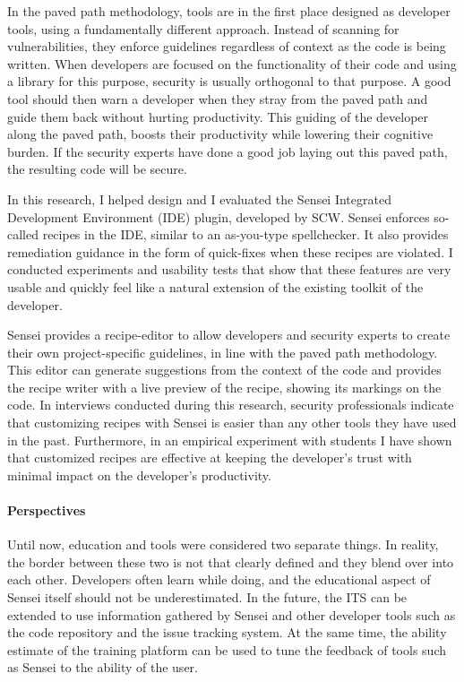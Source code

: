 In the paved path methodology, tools are in the first place designed as developer tools, using a fundamentally different approach.
Instead of scanning for vulnerabilities, they enforce guidelines regardless of context as the code is being written.
When developers are focused on the functionality of their code and using a library for this purpose, security is usually orthogonal to that purpose.
A good tool should then warn a developer when they stray from the paved path and guide them back without hurting productivity.
This guiding of the developer along the paved path, boosts their productivity while lowering their cognitive burden.
If the security experts have done a good job laying out this paved path, the resulting code will be secure.

In this research, I helped design and I evaluated the Sensei Integrated Development Environment (IDE) plugin, developed by SCW.
Sensei enforces so-called recipes in the IDE, similar to an as-you-type spellchecker.
It also provides remediation guidance in the form of quick-fixes when these recipes are violated.
I conducted experiments and usability tests that show that these features are very usable and quickly feel like a natural extension of the existing toolkit of the developer.

Sensei provides a recipe-editor to allow developers and security experts to create their own project-specific guidelines, in line with the paved path methodology.
This editor can generate suggestions from the context of the code and provides the recipe writer with a live preview of the recipe, showing its markings on the code.
In interviews conducted during this research, security professionals indicate that customizing recipes with Sensei is easier than any other tools they have used in the past.
Furthermore, in an empirical experiment with students I have shown that customized recipes are effective at keeping the developer's trust with minimal impact on the developer's productivity.

\paragraph{Perspectives}
Until now, education and tools were considered two separate things.
In reality, the border between these two is not that clearly defined and they blend over into each other.
Developers often learn while doing, and the educational aspect of Sensei itself should not be underestimated.
In the future, the ITS can be extended to use information gathered by Sensei and other developer tools such as the code repository and the issue tracking system.
At the same time, the ability estimate of the training platform can be used to tune the feedback of tools such as Sensei to the ability of the user.